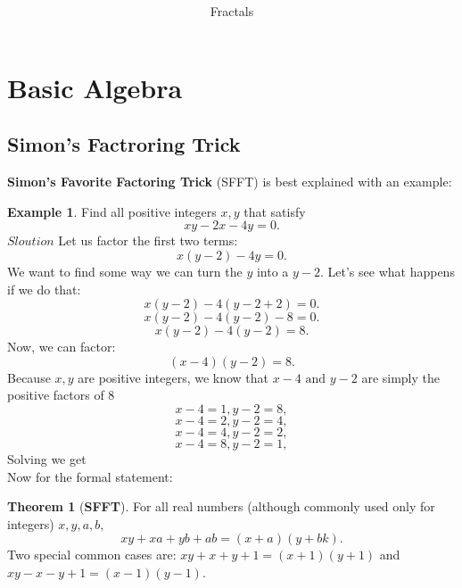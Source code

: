 \documentclass[a4paper]{article}
\theoremstyle{definition}
\newtheorem{exmp}{Example}[section]
\newtheorem{theorem}{Theorem}
\begin{document}
\author{Fractals}
\title{\textbf{}}
\maketitle
\tableofcontents
\noindent
\section{Basic Algebra}
\subsection{Simon's Factroring Trick}
\textbf{Simon’s Favorite Factoring Trick} (SFFT) is best explained with an example:
\begin{exmp}
    Find all positive integers \(x, y\) that satisfy
    \[
        xy- 2x - 4y = 0.
    \]
    \(Sloution\) Let us factor the first two terms:
    \[
        x(y-2) - 4y = 0.
    \]
    We want to find some way we can turn the \(y\) into a \(y - 2\). Let’s see what
    happens if we do that:
    \[
        x(y-2) - 4(y-2+2) = 0.
    \]
    \[
        x(y-2) - 4(y-2)  - 8= 0.
    \]
    \[
        x(y-2) - 4(y-2) = 8.
    \]
    Now, we can factor:
    \[
        (x-4)(y-2) = 8.
    \]
    Because \(x, y\) are positive integers,
    we know that \(x - 4 \text{ and } y - 2\) are simply the positive factors of 8
    \[
        x-4 = 1, y-2=8,
    \]
    \[
        x-4 = 2, y-2=4,
    \]
    \[
        x-4 = 4, y-2=2,
    \]
    \[
        x-4 = 8, y-2=1,
    \]
    Solving we get 
    \\

    \noindent
    Now for the formal statement:
\end{exmp}
\begin{theorem}[\textbf{SFFT}]
    For all real numbers (although commonly used only for integers) \(x, y, a, b, \)
    \[
        xy + xa + yb + ab = (x + a)(y + bk).
    \]
    Two special common cases are: \(xy + x + y + 1 = (x+1)(y+1)\) and \(xy - x - y + 1 = (x-1)(y-1)\).
\end{theorem}
\end{document}
